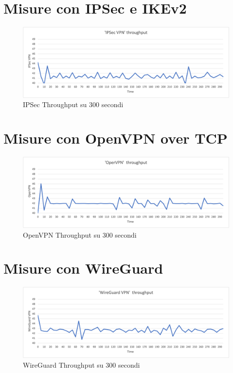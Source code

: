 \section{Misure con IPSec e IKEv2}
\begin{figure}[ht]
    \centering
    \includegraphics[width=12cm]{figure/vpn_thr.png-2.png}
    \caption{IPSec Throughput su 300 secondi}
\end{figure}

\section{Misure con OpenVPN over TCP}
\begin{figure}[ht]
    \centering
    \includegraphics[width=12cm]{figure/vpn_thr.png-3.png}
    \caption{OpenVPN Throughput su 300 secondi}
\end{figure}

\section{Misure con WireGuard}
\begin{figure}[ht]
    \centering
    \includegraphics[width=12cm]{figure/vpn_thr.png-4.png}
    \caption{WireGuard Throughput su 300 secondi}
\end{figure}

